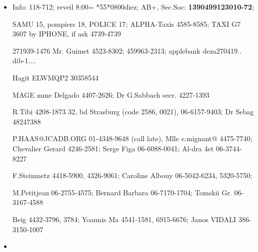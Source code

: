 \documentclass[12pt]{article}
\begin{document}
\begin{itemize}
\item

Info: 118-712; reveil 8:00= *55*0800diez; AB+, Sec.Soc: {\bf 
1390499123010-72}; 

SAMU 15, pompiers 18, POLICE 17; ALPHA-Taxis 4585-8585; TAXI G7 3607 by 
IPHONE, if ask 4739-4739

271939-1476   
Mr. Guimet 4523-8302; 459963-2313; applebank deza270419.. dib-1....

Hagit 
ELWMQP2 
30358544  


MAGE mme Delgado 4407-2626; 
Dr G.Sabbach 
 secr. 4227-1393



R.Tibi 4208-1873 32, bd 
Strasburg (code 2586, 0021), 06-6157-9403;
 Dr Sebag 48247388 


P.HAAS@JCADB.ORG 01-4348-9648 (call late), 
 Mlle e.mignant@ 4475-7740; 
Chevalier Gerard
 4246-2581; Serge Figa 06-6088-0041; Al-dra 4et 06-3744-8227
 

  F.Steinmetz 4418-5900, 
4326-9061;  Caroline Albouy 06-5042-6234,
 5320-5750; 

M.Petitjean 06-2755-4575;
Bernard Barbara 
 06-7170-1704; Tomskii Gr. 06-3167-4588 


Beig 4432-3796, 3784; Yoannis Ma 
4541-1581, 6915-6676;  Janos VIDALI 386-3150-1007


\item 



\end{itemize}
\end{document}
